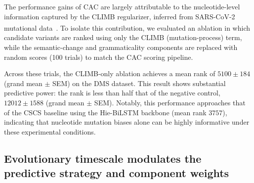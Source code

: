\documentclass[pdflatex,sn-nature]{sn-jnl}
\renewcommand\cite[1]{\unskip\textsuperscript{\citep{#1}}}
\begin{document}

The performance gains of CAC are largely attributable to the nucleotide-level information captured by the CLIMB regularizer, inferred from SARS-CoV-2 mutational data~\cite{yi2021mutational}. To isolate this contribution, we evaluated an ablation in which candidate variants are ranked using only the CLIMB (mutation-process) term, while the semantic-change and grammaticality components are replaced with random scores (100 trials) to match the CAC scoring pipeline.

Across these trials, the CLIMB-only ablation achieves a mean rank of $5100 \pm 184$ (grand mean $\pm$ SEM) on the DMS dataset. This result shows substantial predictive power: the rank is less than half that of the negative control, $12012 \pm 1588$ (grand mean $\pm$ SEM). Notably, this performance approaches that of the CSCS baseline using the Hie-BiLSTM backbone (mean rank $3757$), indicating that nucleotide mutation biases alone can be highly informative under these experimental conditions.


\subsection*{Evolutionary timescale modulates the predictive strategy and component weights}
\end{document}
